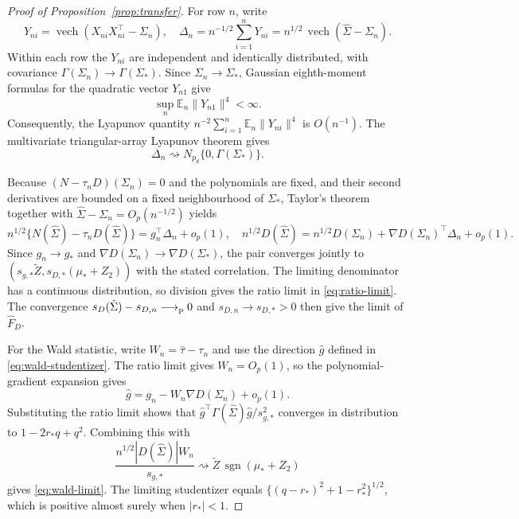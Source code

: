 \documentclass[12pt,a4paper]{article}
\theoremstyle{plain}
\theoremstyle{definition}
\newcommand{\E}{\mathbb{E}}
\newcommand{\vech}{\operatorname{vech}}
\newcommand{\sgn}{\operatorname{sgn}}
\newcommand{\pto}{\longrightarrow_{\rm p}}
\newcommand{\dto}{\rightsquigarrow}
\newcommand{\Sighat}{\hat{\Sigma}}
\newcommand{\FD}{\widehat{F}_D}
\begin{document}
\begin{proof}[Proof of Proposition~\ref{prop:transfer}]
    For row $n$, write
    \begin{equation*}
        Y_{ni}
        =
        \vech(X_{ni}X_{ni}^\top-\Sigma_n)
        ,\quad
        \Delta_n=n^{-1/2}\sum_{i=1}^nY_{ni}
        =
        n^{1/2}\,\vech(\Sighat-\Sigma_n)
        .
    \end{equation*}
    Within each row the $Y_{ni}$ are independent and identically distributed, with covariance $\Gamma(\Sigma_n)\to\Gamma(\Sigma_\ast)$.
    Since $\Sigma_n\to\Sigma_\ast$, Gaussian eighth-moment formulas for the quadratic vector $Y_{n1}$ give
    \begin{equation*}
        \sup_n \E_n\lVert Y_{n1}\rVert^4
        <
        \infty
        .
    \end{equation*}
    Consequently, the Lyapunov quantity $n^{-2}\sum_{i=1}^n\E_n\lVert Y_{ni}\rVert^4$ is $O(n^{-1})$.
    The multivariate triangular-array Lyapunov theorem gives
    \begin{equation*}
        \Delta_n
        \dto
        N_{p_d}\{0,\Gamma(\Sigma_\ast)\}
        .
    \end{equation*}
    
    Because $(N-\tau_nD)(\Sigma_n)=0$ and the polynomials are fixed, and their second derivatives are bounded on a fixed neighbourhood of $\Sigma_\ast$, Taylor's theorem together with $\Sighat-\Sigma_n=O_p(n^{-1/2})$ yields
    \begin{equation*}
        n^{1/2}\{N(\Sighat)-\tau_nD(\Sighat)\}
        =
        g_n^\top\Delta_n+o_p(1)
        ,\quad
        n^{1/2}D(\Sighat)
        =
        n^{1/2}D(\Sigma_n)+\nabla D(\Sigma_n)^\top\Delta_n+o_p(1)
        .
    \end{equation*}
    Since $g_n\to g_\ast$ and $\nabla D(\Sigma_n)\to\nabla D(\Sigma_\ast)$, the pair converges jointly to $(s_{g,\ast}\tilde{Z},s_{D,\ast}(\mu_\ast+Z_2))$ with the stated correlation.
    The limiting denominator has a continuous distribution, so division gives the ratio limit in \eqref{eq:ratio-limit}.
    The convergence $s_D(\Sighat)-s_{D,n}\pto0$ and $s_{D,n}\to s_{D,\ast}>0$ then give the limit of $\FD$.
    
    For the Wald statistic, write $W_n=\hat{\tau}-\tau_n$ and use the direction $\hat{g}$ defined in \eqref{eq:wald-studentizer}.
    The ratio limit gives $W_n=O_p(1)$, so the polynomial-gradient expansion gives
    \begin{equation*}
        \hat{g}
        =
        g_n-W_n\nabla D(\Sigma_n)+o_p(1)
        .
    \end{equation*}
    Substituting the ratio limit shows that $\hat{g}^\top\Gamma(\Sighat)\hat{g}/s_{g,\ast}^2$ converges in distribution to $1-2r_\ast q+q^2$.
    Combining this with
    \begin{equation*}
        \frac{n^{1/2}|D(\Sighat)|W_n}{s_{g,\ast}}
        \dto
        \tilde{Z}\,\sgn(\mu_\ast+Z_2)
    \end{equation*}
    gives \eqref{eq:wald-limit}.
    The limiting studentizer equals $\{(q-r_\ast)^2+1-r_\ast^2\}^{1/2}$, which is positive almost surely when $|r_\ast|<1$.
\end{proof}
\end{document}
